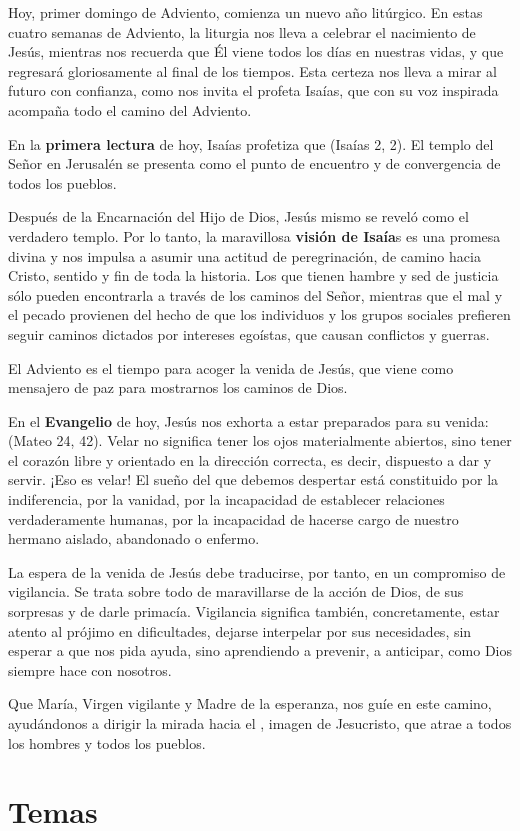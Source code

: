 				\begin{body}
					Hoy, primer domingo de Adviento, comienza un nuevo año litúrgico. En estas cuatro semanas de Adviento, la liturgia nos lleva a celebrar el nacimiento de Jesús, mientras nos recuerda que Él viene todos los días en nuestras vidas, y que regresará gloriosamente al final de los tiempos. Esta certeza nos lleva a mirar al futuro con confianza, como nos invita el profeta Isaías, que con su voz inspirada acompaña todo el camino del Adviento. 
					
					En la \textbf{primera lectura} de hoy, Isaías profetiza que  (Isaías 2, 2). El templo del Señor en Jerusalén se presenta como el punto de encuentro y de convergencia de todos los pueblos. 
					
					Después de la Encarnación del Hijo de Dios, Jesús mismo se reveló como el verdadero templo. Por lo tanto, la maravillosa \textbf{visión de Isaía}s es una promesa divina y nos impulsa a asumir una actitud de peregrinación, de camino hacia Cristo, sentido y fin de toda la historia. Los que tienen hambre y sed de justicia sólo pueden encontrarla a través de los caminos del Señor, mientras que el mal y el pecado provienen del hecho de que los individuos y los grupos sociales prefieren seguir caminos dictados por intereses egoístas, que causan conflictos y guerras. 
					
					El Adviento es el tiempo para acoger la venida de Jesús, que viene como mensajero de paz para mostrarnos los caminos de Dios. 
					
					En el \textbf{Evangelio} de hoy, Jesús nos exhorta a estar preparados para su venida:  (Mateo 24, 42). Velar no significa tener los ojos materialmente abiertos, sino tener el corazón libre y orientado en la dirección correcta, es decir, dispuesto a dar y servir. ¡Eso es velar! El sueño del que debemos despertar está constituido por la indiferencia, por la vanidad, por la incapacidad de establecer relaciones verdaderamente humanas, por la incapacidad de hacerse cargo de nuestro hermano aislado, abandonado o enfermo. 
					
					La espera de la venida de Jesús debe traducirse, por tanto, en un compromiso de vigilancia. Se trata sobre todo de maravillarse de la acción de Dios, de sus sorpresas y de darle primacía. Vigilancia significa también, concretamente, estar atento al prójimo en dificultades, dejarse interpelar por sus necesidades, sin esperar a que nos pida ayuda, sino aprendiendo a prevenir, a anticipar, como Dios siempre hace con nosotros. 
					
					Que María, Virgen vigilante y Madre de la esperanza, nos guíe en este camino, ayudándonos a dirigir la mirada hacia el , imagen de Jesucristo, que atrae a todos los hombres y todos los pueblos.
				\end{body}

\newsection
	\section{Temas}

		
		
		
